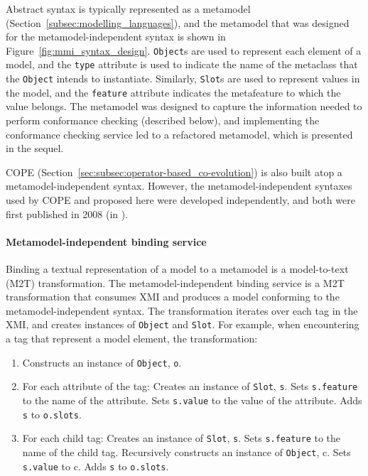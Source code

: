 Abstract syntax is typically represented as a metamodel (Section~\ref{subsec:modelling_languages}), and the metamodel that was designed for the metamodel-independent syntax is shown in Figure~\ref{fig:mmi_syntax_design}. \texttt{Ob\-je\-ct}s are used to represent each element of a model, and the \texttt{ty\-pe} attribute is used to indicate the name of the metaclass that the \texttt{Ob\-je\-ct} intends to instantiate. Similarly, \texttt{Sl\-ot}s are used to represent values in the model, and the \texttt{feature} attribute indicates the metafeature to which the value belongs. The metamodel was designed to capture the information needed to perform conformance checking (described below), and implementing the conformance checking service led to a refactored metamodel, which is presented in the sequel.


COPE (Section~\ref{sec:subsec:operator-based_co-evolution}) is also built atop a metamodel-independent syntax. However, the metamodel-independent syntaxes used by COPE and proposed here were developed independently, and both were first published in 2008 (in \cite{rose08hutn,herrmannsdoerfer08cope}).

\paragraph{Metamodel-independent binding service} Binding a textual representation of a model to a metamodel is a model-to-text (M2T) transformation. The metamodel-independent binding service is a M2T transformation that consumes XMI and produces a model conforming to the metamodel-independent syntax. The transformation iterates over each tag in the XMI, and creates instances of \texttt{Ob\-je\-ct} and \texttt{Sl\-ot}. For example, when encountering a tag that represent a model element, the transformation:

\begin{enumerate}
	\item Constructs an instance of \texttt{Ob\-je\-ct}, \texttt{o}.
	\item For each attribute of the tag:
	\subitem Creates an instance of \texttt{Sl\-ot}, \texttt{s}.
	\subitem Sets \texttt{s.feature} to the name of the attribute.
	\subitem Sets \texttt{s.value} to the value of the attribute.
	\subitem Adds \texttt{s} to \texttt{o.slots}.
	\item For each child tag:
	\subitem Creates an instance of \texttt{Sl\-ot}, \texttt{s}.
	\subitem Sets \texttt{s.feature} to the name of the child tag.
	\subitem Recursively constructs an instance of \texttt{Ob\-je\-ct}, c.
	\subitem Sets \texttt{s.value} to c.
	\subitem Adds \texttt{s} to \texttt{o.slots}.
\end{enumerate}


